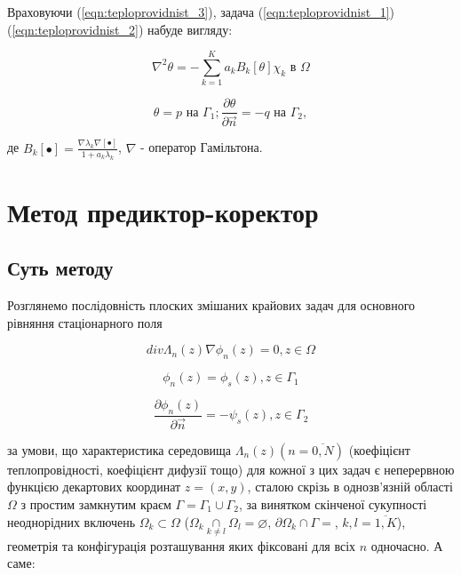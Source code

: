 Враховуючи (\ref{eqn:teploprovidnist_3}), задача (\ref{eqn:teploprovidnist_1})(\ref{eqn:teploprovidnist_2}) набуде вигляду:

\begin{equation}
\label{eqn:teploprovidnist_4}
\nabla^{2} \theta = -\sum_{k=1}^{K}a_k B_k[\theta]\chi_k \text{ в } \Omega
\end{equation}

\begin{equation}
\label{eqn:teploprovidnist_5}
\theta = p \text{ на } \Gamma_1; \frac{\partial\theta}{\partial \overrightarrow{n}} = -q \text{ на } \Gamma_2,
\end{equation}

де $B_k[\bullet]=\frac{\nabla\lambda_k\nabla[\bullet]}{1+a_k\lambda_k}$, $\nabla$ - оператор Гамільтона.

\section{Метод предиктор-коректор}

\subsection{Суть методу}

Розглянемо послідовність плоских змішаних крайових задач для основного
рівняння стаціонарного поля

\begin{equation}
\label{eqn:teploprovidnist_6}
div \Lambda_{n}(z) \nabla \phi_{n}(z) = 0, z\in\Omega
\end{equation}

\begin{equation}
\label{eqn:teploprovidnist_7}
\phi_{n}{(z) = \phi_{s}}(z), z\in\Gamma_{1}
\end{equation}

\begin{equation}
\label{eqn:teploprovidnist_8}
{\frac{\partial\phi_{n}(z)}{\partial\overrightarrow{n}} = {- \psi_{s}}}(z), z\in\Gamma_{2}
\end{equation}
    
за умови, що характеристика середовища
$\Lambda_{n}(z)({n = \overline{0,N}})$ (коефіцієнт
теплопровідності, коефіцієнт дифузії тощо) для кожної з цих задач є
неперервною функцією декартових координат
$z = ( {x,y} )$, сталою скрізь в однозв'язній області
$\Omega$ з простим замкнутим краєм
$\Gamma = {\Gamma_{1} \cup \Gamma_{2}}$, за винятком скінченої
сукупності неоднорідних включень $\Omega_{k}\subset\Omega$
($\Omega_{k}\underset{k \neq l} \cap {\Omega_{l} = \varnothing}$,
$\partial\Omega_{k} \cap {\Gamma =}$,
$k,{l = \overline{1,K}}$), геометрія та конфігурація розташування
яких фіксовані для всіх $n$ одночасно. А саме:


